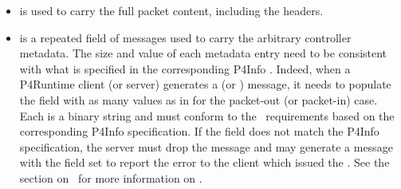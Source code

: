\documentclass[11pt]{article}
\begin{document}
{%
\begin{itemize}%

\item{}
 is used to carry the full packet content, including the headers.%

\item{}
 is a repeated field of  messages used to carry the
arbitrary controller metadata. The size and value of each metadata entry need
to be consistent with what is specified in the corresponding P4Info
. Indeed, when a P4Runtime client (or server)
generates a  (or ) message, it needs to populate the
 field with as many values as in 
for the packet-out (or packet-in) case. Each  is a
binary string and must conform to the~
requirements based on the corresponding P4Info
 specification. If the  field
does not match the P4Info specification, the server must drop the 
message and may generate a  message with the 
field set to report the error to the client which issued the . See
the section on~ for more
information on .%
\end{itemize}%

}
\end{document}
